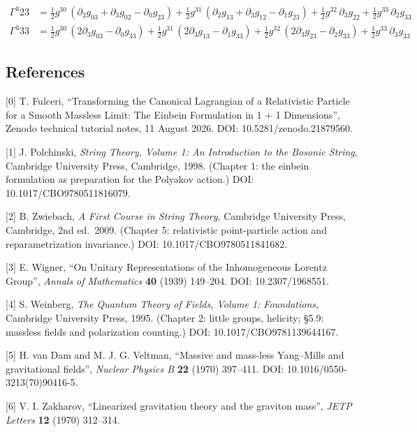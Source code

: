 \documentclass[
]{article}
\begin{document}
\[\begin{aligned}
\Gamma^{3}_{}{23} &= \tfrac{1}{2} g^{30}\, \left( \partial_{2} g_{03} + \partial_{3} g_{02} - \partial_{0} g_{23} \right) + \tfrac{1}{2} g^{31}\, \left( \partial_{2} g_{13} + \partial_{3} g_{12} - \partial_{1} g_{23} \right) + \tfrac{1}{2} g^{32}\, \partial_{3} g_{22} + \tfrac{1}{2} g^{33}\, \partial_{2} g_{33} \\
\Gamma^{3}_{}{33} &= \tfrac{1}{2} g^{30}\, \left( 2 \partial_{3} g_{03} - \partial_{0} g_{33} \right) + \tfrac{1}{2} g^{31}\, \left( 2 \partial_{3} g_{13} - \partial_{1} g_{33} \right) + \tfrac{1}{2} g^{32}\, \left( 2 \partial_{3} g_{23} - \partial_{2} g_{33} \right) + \tfrac{1}{2} g^{33}\, \partial_{3} g_{33}
\end{aligned}\]

\hypertarget{references}{%
\subsection{References}\label{references}}

{[}0{]} T. Fulceri, ``Transforming the Canonical Lagrangian of a
Relativistic Particle for a Smooth Massless Limit: The Einbein
Formulation in 1 + 1 Dimensions'', Zenodo technical tutorial notes, 11
August 2026. DOI: 10.5281/zenodo.21879560.

{[}1{]} J. Polchinski, \emph{String Theory, Volume 1: An Introduction to
the Bosonic String}, Cambridge University Press, Cambridge, 1998.
(Chapter 1: the einbein formulation as preparation for the Polyakov
action.) DOI: 10.1017/CBO9780511816079.

{[}2{]} B. Zwiebach, \emph{A First Course in String Theory}, Cambridge
University Press, Cambridge, 2nd ed.~2009. (Chapter 5: relativistic
point-particle action and reparametrization invariance.) DOI:
10.1017/CBO9780511841682.

{[}3{]} E. Wigner, ``On Unitary Representations of the Inhomogeneous
Lorentz Group'', \emph{Annals of Mathematics} \textbf{40} (1939)
149--204. DOI: 10.2307/1968551.

{[}4{]} S. Weinberg, \emph{The Quantum Theory of Fields, Volume 1:
Foundations}, Cambridge University Press, 1995. (Chapter 2: little
groups, helicity; §5.9: massless fields and polarization counting.) DOI:
10.1017/CBO9781139644167.

{[}5{]} H. van Dam and M. J. G. Veltman, ``Massive and mass-less
Yang--Mills and gravitational fields'', \emph{Nuclear Physics B}
\textbf{22} (1970) 397--411. DOI: 10.1016/0550-3213(70)90416-5.

{[}6{]} V. I. Zakharov, ``Linearized gravitation theory and the graviton
mass'', \emph{JETP Letters} \textbf{12} (1970) 312--314.
\end{document}
